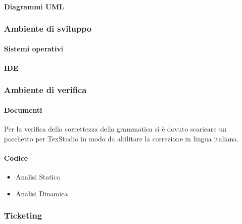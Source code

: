                         \paragraph{Diagrammi UML}
                        \subsubsection{Ambiente di sviluppo}
                            \paragraph{Sistemi operativi}
                            \paragraph{IDE}
                        \subsubsection{Ambiente di verifica}
                            \paragraph{Documenti} 
                                Per la verifica della correttezza della grammatica si è dovuto scaricare un pacchetto per TexStudio in modo da abilitare la correzione in lingua italiana.
                            \paragraph{Codice}
                                \begin{itemize}
                                    \item Analisi Statica
                                    \item Analisi Dinamica
                                \end{itemize}            
                         \subsubsection{Ticketing}
           
                         
                
                    
                     
                
            
    
     
            
            